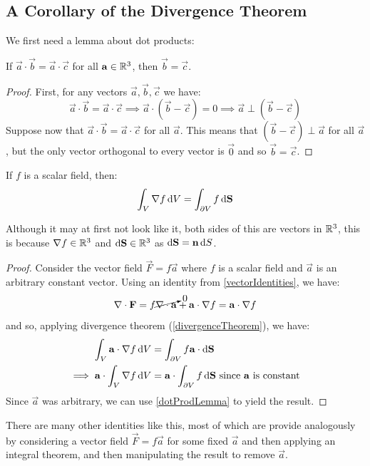 \documentclass[../main.tex]{subfiles}
\begin{document}
\subsection{A Corollary of the Divergence Theorem}
We first need a lemma about dot products:
\begin{lemma}
  If $\vec{a} \cdot \vec{b} = \vec{a} \cdot \vec{c}$ for all $\vec{a} \in \R^3$, then $\vec{b} = \vec{c}$.
  \label{dotProdLemma}
\end{lemma}
\begin{proof}
  First, for any vectors $\vec{a}, \vec{b}, \vec{c}$ we have:
  \[
    \vec{a} \cdot \vec{b} = \vec{a} \cdot \vec{c} \implies \vec{a} \cdot (\vec{b} - \vec{c}) = 0 \implies \vec{a} \perp (\vec{b} - \vec{c})
  \]
  Suppose now that $\vec{a} \cdot \vec{b} = \vec{a} \cdot \vec{c}$ for all $\vec{a}$.
  This means that $(\vec{b} - \vec{c}) \perp \vec{a}$ for all $\vec{a}$, but the only vector orthogonal to every vector is $\vec{0}$ and so $\vec{b} = \vec{c}$.
\end{proof}
\begin{proposition}
  If $f$ is a scalar field, then:
  \label{gradVolumeIdentity}
  \[
    \int_{V} \nabla f \d{V} = \int_{\partial V} f \d{\vec{S}}
  \]
\end{proposition}
\begin{remark}[Note]
  Although it may at first not look like it, both sides of this are vectors in $\R^3$, this is because $\nabla f \in \R^3$ and $\d{\vec{S}} \in \R^3$ as $\d{\vec{S}} = \vec{n}\d{S}$.
\end{remark}
\begin{proof}
  Consider the vector field $\vec{F} = f \vec{a}$ where $f$ is a scalar field and $\vec{a}$ is an arbitrary constant vector.
  Using an identity from \cref{vectorIdentities}, we have:
  \[
    \nabla \cdot \vec{F} = f \cancelto{0}{\nabla \cdot \vec{a}} + \vec{a} \cdot \nabla f = \vec{a} \cdot \nabla f
  \]
  and so, applying divergence theorem (\cref{divergenceTheorem}), we have:
  \begin{align*}
    \int_{V} \vec{a} \cdot \nabla f \d{V} &= \int_{\partial V} f \vec{a} \cdot \d{\vec{S}} \\
    \implies \vec{a} \cdot \int_{V} \nabla f \d{V} &= \vec{a} \cdot \int_{\partial V} f \d{\vec{S}} \text{ since $\vec{a}$ is constant}
  \end{align*}
  Since $\vec{a}$ was arbitrary, we can use \cref{dotProdLemma} to yield the result.
\end{proof}
\begin{remark}
  There are many other identities like this, most of which are provide analogously by considering a vector field $\vec{F} = f\vec{a}$ for some fixed $\vec{a}$ and then applying an integral theorem, and then manipulating the result to remove $\vec{a}$.
\end{remark}
\end{document}
